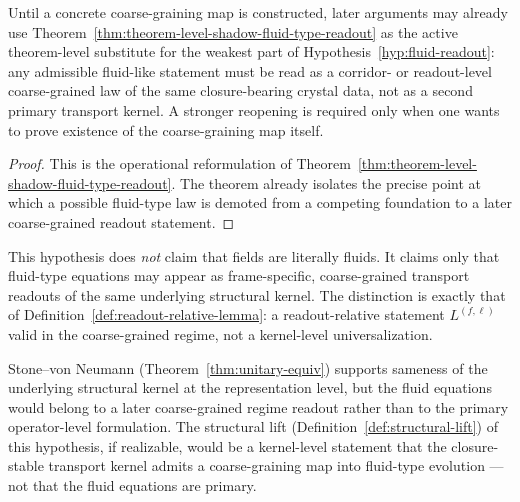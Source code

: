 \begin{corollary}
\label{cor:operational-reading-hypothesis-76-crystal-language}
Until a concrete coarse-graining map is constructed, later arguments may already use Theorem~\ref{thm:theorem-level-shadow-fluid-type-readout} as the active theorem-level substitute for the weakest part of Hypothesis~\ref{hyp:fluid-readout}: any admissible fluid-like statement must be read as a corridor- or readout-level coarse-grained law of the same closure-bearing crystal data, not as a second primary transport kernel. A stronger reopening is required only when one wants to prove existence of the coarse-graining map itself.
\end{corollary}

\begin{proof}
This is the operational reformulation of Theorem~\ref{thm:theorem-level-shadow-fluid-type-readout}. The theorem already isolates the precise point at which a possible fluid-type law is demoted from a competing foundation to a later coarse-grained readout statement.
\end{proof}


\begin{remark}
This hypothesis does \emph{not} claim that fields are literally fluids.
It claims only that fluid-type equations may appear as frame-specific,
coarse-grained transport readouts of the same underlying structural
kernel. The distinction is exactly that of
Definition~\ref{def:readout-relative-lemma}: a readout-relative statement
$L^{(f,\ell)}$ valid in the coarse-grained regime, not a kernel-level
universalization.
\end{remark}

\begin{remark}
Stone--von Neumann (Theorem~\ref{thm:unitary-equiv}) supports sameness
of the underlying structural kernel at the representation level, but the
fluid equations would belong to a later coarse-grained regime readout
rather than to the primary operator-level formulation. The structural
lift (Definition~\ref{def:structural-lift}) of this hypothesis, if
realizable, would be a kernel-level statement that the closure-stable
transport kernel admits a coarse-graining map into fluid-type evolution
--- not that the fluid equations are primary.
\end{remark}



